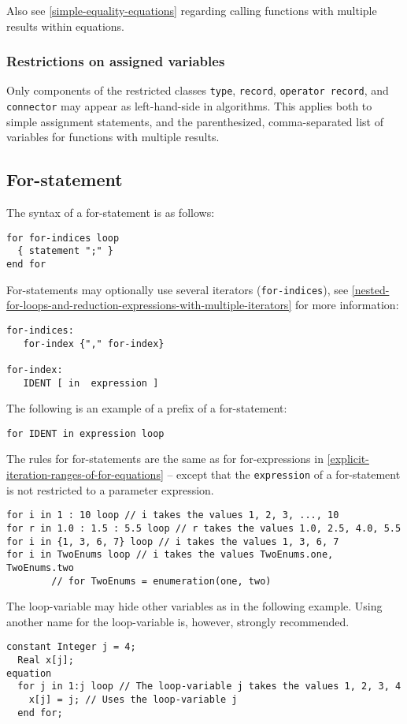 \begin{nonnormative}
Also see \cref{simple-equality-equations} regarding calling functions with
multiple results within equations.
\end{nonnormative}

\subsubsection{Restrictions on assigned variables}\label{restrictions-on-assigned-variables}
Only components of the restricted classes \lstinline!type!, \lstinline!record!, \lstinline!operator record!, and \lstinline!connector! may appear as left-hand-side in algorithms.
This applies both to simple assignment statements, and the parenthesized, comma-separated list of variables for functions with multiple results.

\subsection{For-statement}\label{for-statement}

The syntax of a for-statement is as follows:
\begin{lstlisting}[language=grammar]
for for-indices loop
  { statement ";" }
end for
\end{lstlisting}
For-statements may optionally use several iterators (\lstinline!for-indices!), see
\cref{nested-for-loops-and-reduction-expressions-with-multiple-iterators} for more information:
\begin{lstlisting}[language=grammar]
for-indices:
   for-index {"," for-index}

for-index:
   IDENT [ in  expression ]
\end{lstlisting}
The following is an example of a prefix of a for-statement:
\begin{lstlisting}[language=modelica]
for IDENT in expression loop
\end{lstlisting}
The rules for for-statements are the same as for for-expressions in \cref{explicit-iteration-ranges-of-for-equations} -- except that the \lstinline!expression! of a for-statement is not restricted to a parameter expression.

\begin{example}
\begin{lstlisting}[language=modelica]
for i in 1 : 10 loop // i takes the values 1, 2, 3, ..., 10
for r in 1.0 : 1.5 : 5.5 loop // r takes the values 1.0, 2.5, 4.0, 5.5
for i in {1, 3, 6, 7} loop // i takes the values 1, 3, 6, 7
for i in TwoEnums loop // i takes the values TwoEnums.one, TwoEnums.two
        // for TwoEnums = enumeration(one, two)
\end{lstlisting}
The loop-variable may hide other variables as in the following example.  Using another name for the loop-variable is, however, strongly recommended.
\begin{lstlisting}[language=modelica]
  constant Integer j = 4;
  Real x[j];
equation
  for j in 1:j loop // The loop-variable j takes the values 1, 2, 3, 4
    x[j] = j; // Uses the loop-variable j
  end for;
\end{lstlisting}
\end{example}

